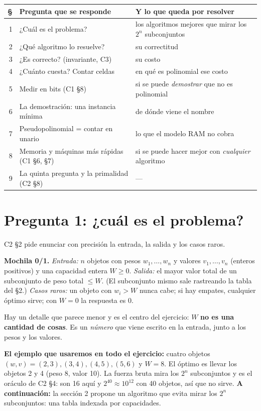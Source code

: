 \documentclass[11pt]{article}
\begin{document}
\begin{center}\small
\begin{tabular}{@{}rll@{}}
\toprule
\textbf{§} & \textbf{Pregunta que se responde} & \textbf{Y lo que queda por resolver}\\
\midrule
1 & ¿Cuál es el problema? & los algoritmos mejores que mirar los $2^n$ subconjuntos\\
2 & ¿Qué algoritmo lo resuelve? & su correctitud\\
3 & ¿Es correcto? (invariante, C3) & su costo\\
4 & ¿Cuánto cuesta? Contar celdas & en qué es polinomial ese costo\\
5 & Medir en bits (C1 §8) & si se puede \emph{demostrar} que no es polinomial\\
6 & La demostración: una instancia mínima & de dónde viene el nombre\\
7 & Pseudopolinomial = contar en unario & lo que el modelo RAM no cobra\\
8 & Memoria y máquinas más rápidas (C1 §6, §7) & si se puede hacer mejor con \emph{cualquier} algoritmo\\
9 & La quinta pregunta y la primalidad (C2 §8) & ---\\
\bottomrule
\end{tabular}
\end{center}

\section{Pregunta 1: ¿cuál es el problema?}

C2 §2 pide enunciar con precisión la entrada, la salida y los casos raros.

\textbf{Mochila 0/1.} \emph{Entrada:} $n$ objetos con pesos $w_1,\dots,w_n$ y valores $v_1,\dots,v_n$ (enteros
positivos) y una capacidad entera $W\ge0$. \emph{Salida:} el mayor valor total de un subconjunto de peso total
$\le W$. (El subconjunto mismo sale rastreando la tabla del §2.) \emph{Casos raros:} un objeto con $w_i>W$
nunca cabe; si hay empates, cualquier óptimo sirve; con $W=0$ la respuesta es $0$.

Hay un detalle que parece menor y es el centro del ejercicio: $W$ \textbf{no es una cantidad de cosas}. Es
un \emph{número} que viene escrito en la entrada, junto a los pesos y los valores.

\textbf{El ejemplo que usaremos en todo el ejercicio:} cuatro objetos $(w,v)=(2,3),(3,4),(4,5),(5,6)$ y
$W=8$. El óptimo es llevar los objetos 2 y 4 (peso 8, valor 10). La fuerza bruta mira los $2^n$
subconjuntos y es el oráculo de C2 §4: son 16 aquí y $2^{40}\approx10^{12}$ con 40 objetos, así que no sirve.
\textbf{A continuación:} la sección 2 propone un algoritmo que evita mirar los $2^n$ subconjuntos: una tabla indexada por capacidades.
\end{document}

